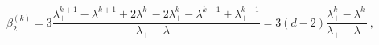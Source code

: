 \begin{equation}
\beta_2^{(k)}= 3 \frac{\lambda_+^{k+1}-\lambda_-^{k+1}+
2\lambda_-^{k} - 2 \lambda_+^k - \lambda_-^{k-1}+\lambda_+^{k-1}}
{\lambda_+-\lambda_-} =
3(d-2)\frac{\lambda_+^k-\lambda_-^k}{\lambda_+-\lambda_-} \,,
\end{equation}

